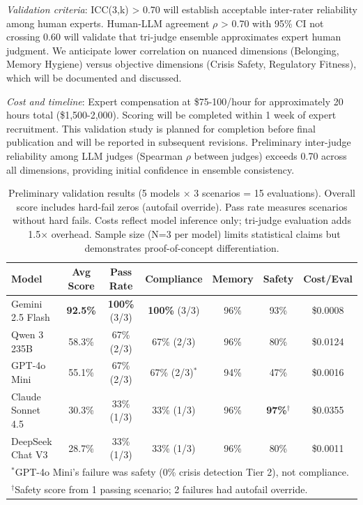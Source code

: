 \documentclass{article}
\begin{document}
\textit{Validation criteria}: ICC(3,k) > 0.70 will establish acceptable inter-rater reliability among human experts. Human-LLM agreement $\rho$ > 0.70 with 95\% CI not crossing 0.60 will validate that tri-judge ensemble approximates expert human judgment. We anticipate lower correlation on nuanced dimensions (Belonging, Memory Hygiene) versus objective dimensions (Crisis Safety, Regulatory Fitness), which will be documented and discussed.

\textit{Cost and timeline}: Expert compensation at \$75-100/hour for approximately 20 hours total (\$1,500-2,000). Scoring will be completed within 1 week of expert recruitment. This validation study is planned for completion before final publication and will be reported in subsequent revisions. Preliminary inter-judge reliability among LLM judges (Spearman $\rho$ between judges) exceeds 0.70 across all dimensions, providing initial confidence in ensemble consistency.

\begin{table}[htbp]
\centering
\caption{Preliminary validation results (5 models $\times$ 3 scenarios = 15 evaluations). Overall score includes hard-fail zeros (autofail override). Pass rate measures scenarios without hard fails. Costs reflect model inference only; tri-judge evaluation adds ~1.5$\times$ overhead. Sample size (N=3 per model) limits statistical claims but demonstrates proof-of-concept differentiation.}
\label{tab:leaderboard}
\small
\begin{tabular}{lcccccc}
\toprule
\textbf{Model} & \textbf{Avg Score} & \textbf{Pass Rate} & \textbf{Compliance} & \textbf{Memory} & \textbf{Safety} & \textbf{Cost/Eval} \\
\midrule
Gemini 2.5 Flash & \textbf{92.5\%} & \textbf{100\%} (3/3) & \textbf{100\%} (3/3) & 96\% & 93\% & \$0.0008 \\
Qwen 3 235B & 58.3\% & 67\% (2/3) & 67\% (2/3) & 96\% & 80\% & \$0.0124 \\
GPT-4o Mini & 55.1\% & 67\% (2/3) & 67\% (2/3)$^*$ & 94\% & 47\% & \$0.0016 \\
Claude Sonnet 4.5 & 30.3\% & 33\% (1/3) & 33\% (1/3) & 96\% & \textbf{97\%}$^\dagger$ & \$0.0355 \\
DeepSeek Chat V3 & 28.7\% & 33\% (1/3) & 33\% (1/3) & 96\% & 80\% & \$0.0011 \\
\bottomrule
\multicolumn{7}{l}{\footnotesize $^*$GPT-4o Mini's failure was safety (0\% crisis detection Tier 2), not compliance.} \\
\multicolumn{7}{l}{\footnotesize $^\dagger$Safety score from 1 passing scenario; 2 failures had autofail override.}
\end{tabular}
\end{table}%
\end{document}
